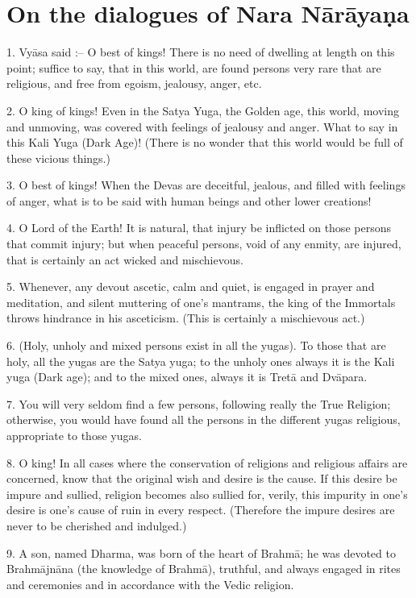 \chapter{On the dialogues of Nara N\=ar\=aya\d{n}a}

1. Vy\=asa said :-- O best of kings! There is no need of dwelling at length on this point; suffice to say, that in this world, are found persons very rare that are religious, and free from egoism, jealousy, anger, etc.

2. O king of kings! Even in the Satya Yuga, the Golden age, this world, moving and unmoving, was covered with feelings of jealousy and anger. What to say in this Kali Yuga (Dark Age)! (There is no wonder that this world would be full of these vicious things.)

3. O best of kings! When the Devas are deceitful, jealous, and filled with feelings of anger, what is to be said with human beings and other lower creations!

4. O Lord of the Earth! It is natural, that injury be inflicted on those persons that commit injury; but when peaceful persons, void of any enmity, are injured, that is certainly an act wicked and mischievous.

5. Whenever, any devout ascetic, calm and quiet, is engaged in prayer and meditation, and silent muttering of one's mantrams, the king of the Immortals throws hindrance in his asceticism. (This is certainly a mischievous act.)

6. (Holy, unholy and mixed persons exist in all the yugas). To those that are holy, all the yugas are the Satya yuga; to the unholy ones always it is the Kali yuga (Dark age); and to the mixed ones, always it is Tret\=a and Dv\=apara.

7. You will very seldom find a few persons, following really the True Religion; otherwise, you would have found all the persons in the different yugas religious, appropriate to those yugas.

8. O king! In all cases where the conservation of religions and religious affairs are concerned, know that the original wish and desire is the cause. If this desire be impure and sullied, religion becomes also sullied for, verily, this impurity in one's desire is one's cause of ruin in every respect. (Therefore the impure desires are never to be cherished and indulged.)

9. A son, named Dharma, was born of the heart of Brahm\=a; he was devoted to Brahm\=ajn\=ana (the knowledge of Brahm\=a), truthful, and always engaged in rites and ceremonies and in accordance with the Vedic religion.

